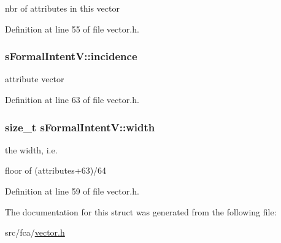 nbr of attributes in this vector 



\-Definition at line 55 of file vector.\-h.

\hypertarget{structsFormalIntentV_af2b03b37318f9292907b0f09c599cc30}{
\subsubsection[{incidence}]{ {\bf s\-Formal\-Intent\-V\-::incidence}}}\label{structsFormalIntentV_af2b03b37318f9292907b0f09c599cc30}


attribute vector 



\-Definition at line 63 of file vector.\-h.

\hypertarget{structsFormalIntentV_a70711ba6edc09660adb6a838ef8d1555}{
\subsubsection[{width}]{\setlength{\rightskip}{0pt plus 5cm}size\-\_\-t {\bf s\-Formal\-Intent\-V\-::width}}}\label{structsFormalIntentV_a70711ba6edc09660adb6a838ef8d1555}


the width, i.\-e. 

floor of (attributes+63)/64 

\-Definition at line 59 of file vector.\-h.



\-The documentation for this struct was generated from the following file\-:\begin{DoxyCompactItemize}
\item 
src/fca/\hyperlink{vector_8h}{vector.\-h}\end{DoxyCompactItemize}
